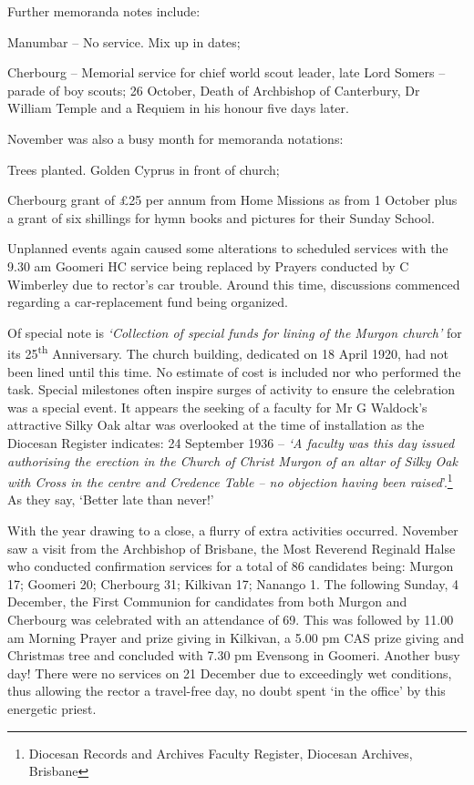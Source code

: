 Further memoranda notes include:



Manumbar -- No service. Mix up in dates;



Cherbourg -- Memorial service for chief world scout leader, late Lord Somers -- parade of boy scouts; 26 October, Death of Archbishop of Canterbury, Dr William Temple and a Requiem in his honour five days later.



November was also a busy month for memoranda notations:



Trees planted. Golden Cyprus in front of church;



Cherbourg grant of \pounds25 per annum from Home Missions as from 1 October plus a grant of six shillings for hymn books and pictures for their Sunday School.



Unplanned events again caused some alterations to scheduled services with the 9.30 am Goomeri HC service being replaced by Prayers conducted by C Wimberley due to rector's car trouble. Around this time, discussions commenced regarding a car-replacement fund being organized.



Of special note is \emph{`Collection of special funds for lining of the Murgon church'} for its 25\textsuperscript{th} Anniversary. The church building, dedicated on 18 April 1920, had not been lined until this time. No estimate of cost is included nor who performed the task. Special milestones often inspire surges of activity to ensure the celebration was a special event. It appears the seeking of a faculty for Mr G Waldock's attractive Silky Oak altar was overlooked at the time of installation as the Diocesan Register indicates: 24 September 1936 -- \emph{`A faculty was this day issued authorising the erection in the Church of Christ Murgon of an altar of Silky Oak with Cross in the centre and Credence Table -- no objection having been raised}'.\footnote{Diocesan Records and Archives Faculty Register, Diocesan Archives, Brisbane} As they say, `Better late than never!'


With the year drawing to a close, a flurry of extra activities occurred. November saw a visit from the Archbishop of Brisbane, the Most Reverend Reginald Halse who conducted confirmation services for a total of 86 candidates being: Murgon 17; Goomeri 20; Cherbourg 31; Kilkivan 17; Nanango 1. The following Sunday, 4 December, the First Communion for candidates from both Murgon and Cherbourg was celebrated with an attendance of 69. This was followed by 11.00 am Morning Prayer and prize giving in Kilkivan, a 5.00 pm CAS prize giving and Christmas tree and concluded with 7.30 pm Evensong in Goomeri. Another busy day! There were no services on 21 December due to exceedingly wet conditions, thus allowing the rector a travel-free day, no doubt spent `in the office' by this energetic priest.



